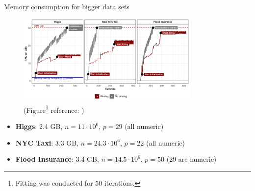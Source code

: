 \documentclass[t,10pt]{beamer}
\begin{document}
\begin{frame}{Memory consumption for bigger data sets}
  \begin{figure}
    \centering
    \includegraphics[width=0.8\textwidth]{figures/fig-cacb-big-data.pdf}
    \caption{\small(Figure\footnote[frame,1]{Fitting was conducted for 50 iterations.} reference: \citet{schalk2022accelerated})}
  \end{figure}\vspace{-0.5cm}
  \begin{itemize}
      \item \textbf{Higgs}: 2.4 GB, $n = 11\cdot 10^6$, $p = 29$ (all numeric)
      \item \textbf{NYC Taxi}: 3.3 GB, $n = 24.3\cdot 10^6$, $p = 22$ (all numeric)
      \item \textbf{Flood Insurance}: 3.4 GB, $n = 14.5\cdot 10^6$, $p = 50$ (29 are numeric)
  \end{itemize} 
\end{frame}

\end{document}
